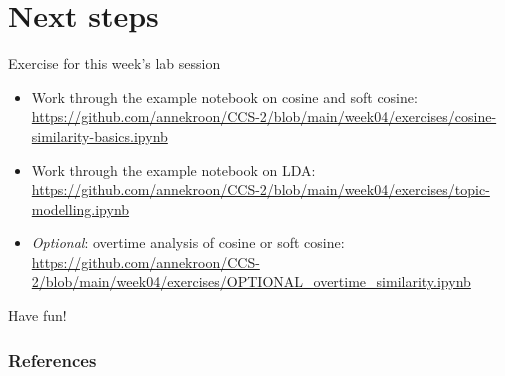 \documentclass[handout]{beamer}
\begin{document}
\section{Next steps}

\begin{frame}[plain]
	
	\begin{block}{Exercise for this week's lab session}
		\footnotesize
		\begin{itemize}
			\item Work through the example notebook on cosine and soft cosine: \url{https://github.com/annekroon/CCS-2/blob/main/week04/exercises/cosine-similarity-basics.ipynb}
			\item Work through the example notebook on LDA: \url{https://github.com/annekroon/CCS-2/blob/main/week04/exercises/topic-modelling.ipynb}
			\item \emph{Optional}: overtime analysis of cosine or soft cosine:
			\url{https://github.com/annekroon/CCS-2/blob/main/week04/exercises/OPTIONAL_overtime_similarity.ipynb}
		\end{itemize}
	\end{block}
	
\end{frame}

\begin{frame}[standout]
Have fun!
\end{frame}

\begin{frame}[t,allowframebreaks]
	\frametitle{References}
	\printbibliography
\end{frame}
\end{document}
